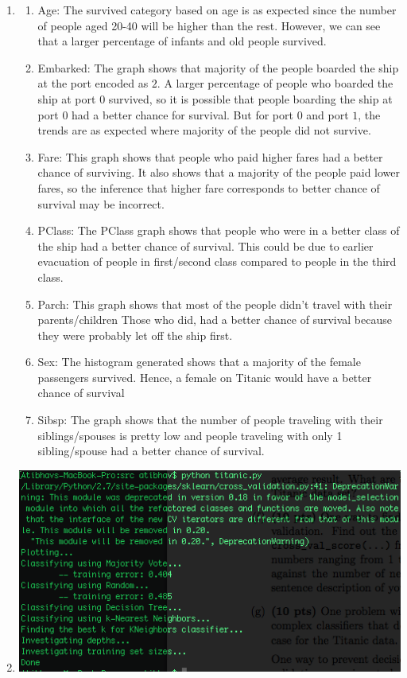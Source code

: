 \documentclass[11pt]{article}
\newcommand{\solution}[1]{{{\color{blue}{\bf Solution:} {#1}}}}
\begin{document}
\begin{enumerate}
\item 
\begin{enumerate}
\item Age: The survived category based on age is as expected since the 
		number of people aged 20-40 will be higher than the rest. However,
		we can see that a larger percentage of infants and old people survived.	
\item Embarked: The graph shows that majority of the people boarded the ship
		at the port encoded as $2$. A larger percentage of people who boarded the
		ship at port $0$ survived, so it is possible that people boarding the 
		ship at port $0$ had a better chance for survival. But for port $0$ and
		port $1$, the trends are as expected where majority of the people did not
		survive.
\item Fare: This graph shows that people who paid higher fares had a better
		chance of surviving. It also shows that a majority of the people paid
		lower fares, so the inference that higher fare corresponds to better chance
		of survival may be incorrect.
\item PClass: The PClass graph shows that people who were in a better class of the
		ship had a better chance of survival. This could be due to earlier evacuation
		of people in first/second class compared to people in the third class.
\item Parch: This graph shows that most of the people didn't travel with their parents/children
		Those who did, had a better chance of survival because they were probably 
		let off the ship first.
\item Sex: The histogram generated shows that a majority of the female passengers
		survived. Hence, a female on Titanic would have a better chance of survival
\item Sibsp: The graph shows that the number of people traveling with their siblings/spouses
		is pretty low and people traveling with only 1 sibling/spouse had a better
		chance of survival.
\end{enumerate}
\newpage
\item 
\solution{}
\newline
\includegraphics[scale=0.6]{4b.png}


\end{enumerate}
\end{document}
